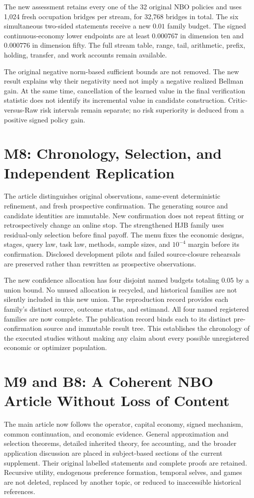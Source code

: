 The new assessment retains every one of the 32 original NBO policies and uses 1,024 fresh occupation bridges per stream, for 32,768 bridges in total. The six simultaneous two-sided statements receive a new $0.01$ family budget. The signed continuous-economy lower endpoints are at least $0.000767$ in dimension ten and $0.000776$ in dimension fifty. The full stream table, range, tail, arithmetic, prefix, holding, transfer, and work accounts remain available.

The original negative norm-based sufficient bounds are not removed. The new result explains why their negativity need not imply a negative realized Bellman gain. At the same time, cancellation of the learned value in the final verification statistic does not identify its incremental value in candidate construction. Critic-versus-Raw risk intervals remain separate; no risk superiority is deduced from a positive signed policy gain.

\section{M8: Chronology, Selection, and Independent Replication}
The article distinguishes original observations, same-event deterministic refinement, and fresh prospective confirmation. The generating source and candidate identities are immutable. New confirmation does not repeat fitting or retrospectively change an online stop. The strengthened HJB family uses residual-only selection before final payoff. The menu fixes the economic designs, stages, query law, task law, methods, sample sizes, and $10^{-4}$ margin before its confirmation. Disclosed development pilots and failed source-closure rehearsals are preserved rather than rewritten as prospective observations.

The new confidence allocation has four disjoint named budgets totaling $0.05$ by a union bound. No unused allocation is recycled, and historical families are not silently included in this new union. The reproduction record provides each family's distinct source, outcome status, and estimand. All four named registered families are now complete. The publication record binds each to its distinct pre-confirmation source and immutable result tree. This establishes the chronology of the executed studies without making any claim about every possible unregistered economic or optimizer population.

\section{M9 and B8: A Coherent NBO Article Without Loss of Content}
The main article now follows the operator, capital economy, signed mechanism, common continuation, and economic evidence. General approximation and selection theorems, detailed inherited theory, fee accounting, and the broader application discussion are placed in subject-based sections of the current supplement. Their original labelled statements and complete proofs are retained. Recursive utility, endogenous preference formation, temporal selves, and games are not deleted, replaced by another topic, or reduced to inaccessible historical references.

